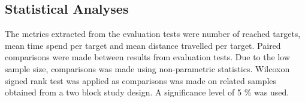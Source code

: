 \subsection{Statistical Analyses}
The metrics extracted from the evaluation tests were number of reached targets, mean time spend per target and mean distance travelled per target. Paired comparisons were made between results from evaluation tests. Due to the low sample size, comparisons was made using non-parametric statistics. Wilcoxon signed rank test was applied as comparisons was made on related samples obtained from a two block study design. A significance level of 5 $\%$ was used.